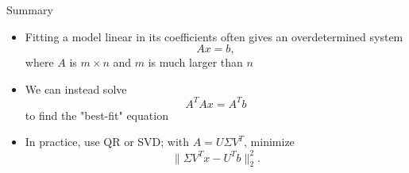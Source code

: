 \documentclass[10pt]{beamer}
\begin{document}
\begin{frame}{Summary}
    \begin{itemize}
        \item Fitting a model linear in its coefficients often gives an overdetermined system
        $$
        Ax=b,
        $$
        where $A$ is $m\times n$ and $m$ is much larger than $n$
            \vfill 
        \item We can instead solve 
        $$
        A^TAx = A^Tb
        $$
        to find the "best-fit" equation
        \vfill 
        \item In practice, use QR or SVD; with $A=U\Sigma V^T$, minimize
                $$ \|\Sigma V^Tx-U^Tb\|_2^2. $$

    \end{itemize}
\end{frame}

    

\end{document}
